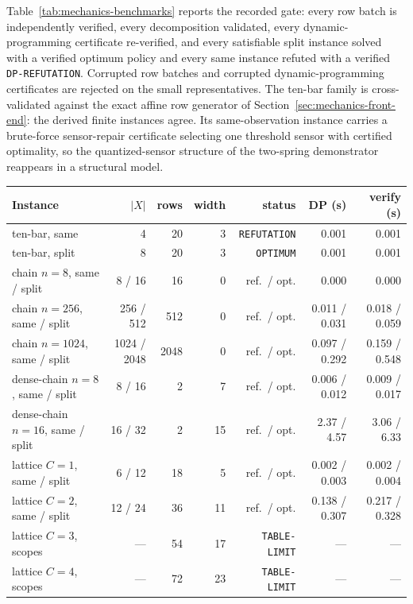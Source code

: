\documentclass[11pt]{article}
\theoremstyle{plain}
\theoremstyle{definition}
\theoremstyle{remark}
\begin{document}
Table~\ref{tab:mechanics-benchmarks} reports the recorded gate: every row
batch is independently verified, every decomposition validated, every
dynamic-programming certificate re-verified, and every satisfiable split
instance solved with a verified optimum policy and every same instance
refuted with a verified \texttt{DP-REFUTATION}.  Corrupted row batches and
corrupted dynamic-programming certificates are rejected on the small
representatives.  The ten-bar family is cross-validated against the exact
affine row generator of Section~\ref{sec:mechanics-front-end}: the derived
finite instances agree.  Its same-observation instance carries a brute-force
sensor-repair certificate selecting one threshold sensor with certified
optimality, so the quantized-sensor structure of the two-spring demonstrator
reappears in a structural model.

\begin{center}
\footnotesize
\begin{tabular}{@{}lrrrrrr@{}}
\toprule
Instance & \(\lvert X\rvert\) & rows & width & status & DP (s) & verify (s)\\
\midrule
ten-bar, same & 4 & 20 & 3 & \texttt{REFUTATION} & 0.001 & 0.001\\
ten-bar, split & 8 & 20 & 3 & \texttt{OPTIMUM} & 0.001 & 0.001\\
chain \(n{=}8\), same / split & 8 / 16 & 16 & 0 & ref.\ / opt. & 0.000 & 0.000\\
chain \(n{=}256\), same / split & 256 / 512 & 512 & 0 & ref.\ / opt. & 0.011 / 0.031 & 0.018 / 0.059\\
chain \(n{=}1024\), same / split & 1024 / 2048 & 2048 & 0 & ref.\ / opt. & 0.097 / 0.292 & 0.159 / 0.548\\
dense-chain \(n{=}8\), same / split & 8 / 16 & 2 & 7 & ref.\ / opt. & 0.006 / 0.012 & 0.009 / 0.017\\
dense-chain \(n{=}16\), same / split & 16 / 32 & 2 & 15 & ref.\ / opt. & 2.37 / 4.57 & 3.06 / 6.33\\
lattice \(C{=}1\), same / split & 6 / 12 & 18 & 5 & ref.\ / opt. & 0.002 / 0.003 & 0.002 / 0.004\\
lattice \(C{=}2\), same / split & 12 / 24 & 36 & 11 & ref.\ / opt. & 0.138 / 0.307 & 0.217 / 0.328\\
lattice \(C{=}3\), scopes & --- & 54 & 17 & \texttt{TABLE-LIMIT} & --- & ---\\
lattice \(C{=}4\), scopes & --- & 72 & 23 & \texttt{TABLE-LIMIT} & --- & ---\\
\bottomrule
\end{tabular}
\label{tab:mechanics-benchmarks}
\end{center}
\end{document}
